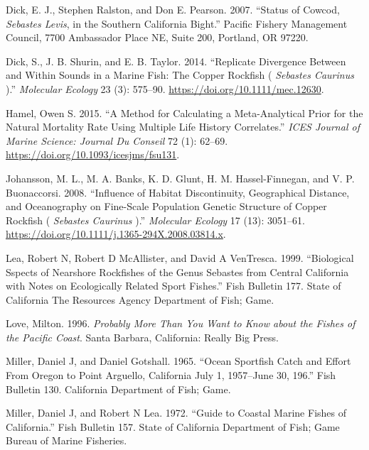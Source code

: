 \documentclass[11pt,
  english,
  letterpaper,
]{article}
\newlength{\cslhangindent}
\newenvironment{CSLReferences}[2] %
 {%
  \setlength{\parindent}{0pt}
  \ifodd #1 \everypar{\setlength{\hangindent}{\cslhangindent}}\ignorespaces\fi
  \ifnum #2 > 0
  \setlength{\parskip}{#2\baselineskip}
  \fi
 }%
 {}
\begin{document}
\begin{CSLReferences}{1}{0}
\leavevmode{}%
Dick, E. J., Stephen Ralston, and Don E. Pearson. 2007. {``Status of Cowcod, \emph{{Sebastes} Levis}, in the {Southern} {California} {Bight}.''} Pacific Fishery Management Council, 7700 Ambassador Place NE, Suite 200, Portland, OR 97220.

\leavevmode{}%
Dick, S., J. B. Shurin, and E. B. Taylor. 2014. {``Replicate Divergence Between and Within Sounds in a Marine Fish: The Copper Rockfish ( \emph{{Sebastes} Caurinus} ).''} \emph{Molecular Ecology} 23 (3): 575--90. \url{https://doi.org/10.1111/mec.12630}.

\leavevmode{}%
Hamel, Owen S. 2015. {``A Method for Calculating a Meta-Analytical Prior for the Natural Mortality Rate Using Multiple Life History Correlates.''} \emph{ICES Journal of Marine Science: Journal Du Conseil} 72 (1): 62--69. \url{https://doi.org/10.1093/icesjms/fsu131}.

\leavevmode{}%
Johansson, M. L., M. A. Banks, K. D. Glunt, H. M. Hassel-Finnegan, and V. P. Buonaccorsi. 2008. {``Influence of Habitat Discontinuity, Geographical Distance, and Oceanography on Fine-Scale Population Genetic Structure of Copper Rockfish ( \emph{{Sebastes} Caurinus} ).''} \emph{Molecular Ecology} 17 (13): 3051--61. \url{https://doi.org/10.1111/j.1365-294X.2008.03814.x}.

\leavevmode{}%
Lea, Robert N, Robert D McAllister, and David A VenTresca. 1999. {``Biological Sspects of Nearshore Rockfishes of the Genus Sebastes from {Central} {California} with Notes on Ecologically Related Sport Fishes.''} Fish Bulletin 177. State of California The Resources Agency Department of Fish; Game.

\leavevmode{}%
Love, Milton. 1996. \emph{Probably More Than You Want to Know about the Fishes of the {Pacific} {Coast}}. Santa Barbara, California: Really Big Press.

\leavevmode{}%
Miller, Daniel J, and Daniel Gotshall. 1965. {``Ocean {Sportfish} {Catch} and {Effort} {From} {Oregon} to {Point} {Arguello}, {California} {July} 1, 1957--{June} 30, 196.''} Fish Bulletin 130. California Department of Fish; Game.

\leavevmode{}%
Miller, Daniel J, and Robert N Lea. 1972. {``Guide to Coastal {Marine} {Fishes} of {California}.''} Fish Bulletin 157. State of California Department of Fish; Game Bureau of Marine Fisheries.


\end{CSLReferences}
\end{document}
